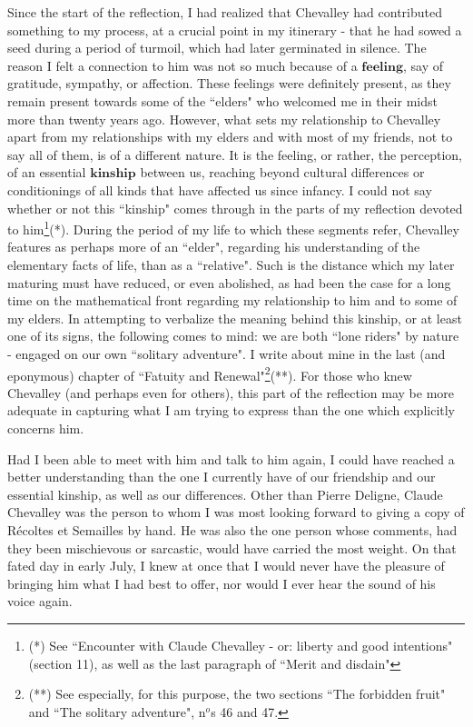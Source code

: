  Since the start of the reflection, I had realized that Chevalley had contributed something to my process, at a crucial point in my itinerary - that he had sowed a seed during a period of turmoil, which had later germinated in silence. The reason I felt a connection to him was not so much because of a $\textbf{feeling}$, say of gratitude, sympathy, or affection. These feelings were definitely present, as they remain present towards some of the ``elders" who welcomed me in their midst more than twenty years ago. However, what sets my relationship to Chevalley apart from my relationships with my elders and with most of my friends, not to say all of them, is of a different nature. It is the feeling, or rather, the perception, of an essential $\textbf{kinship}$ between us, reaching beyond cultural differences or conditionings of all kinds that have affected us since infancy. I could not say whether or not this ``kinship" comes through in the parts of my reflection devoted to him\footnote{(*) See ``Encounter with Claude Chevalley - or: liberty and good intentions" (section 11), as well as the last paragraph of ``Merit and disdain"}(*). During the period of my life to which these segments refer, Chevalley features as perhaps more of an ``elder", regarding his understanding of the elementary facts of life, than as a ``relative". Such is the distance which my later maturing must have reduced, or even abolished, as had been the case for a long time on the mathematical front regarding my relationship to him and to some of my elders. In attempting to verbalize the meaning behind this kinship, or at least one of its signs, the following comes to mind: we are both ``lone riders" by nature - engaged on our own ``solitary adventure". I write about mine in the last (and eponymous) chapter of ``Fatuity and Renewal"\footnote{(**) See especially, for this purpose, the two sections ``The forbidden fruit" and ``The solitary adventure", n$^o$s 46 and 47.}(**). For those who knew Chevalley (and perhaps even for others), this part of the reflection may be more adequate in capturing what I am trying to express than the one which explicitly concerns him.
 
Had I been able to meet with him and talk to him again, I could have reached a better understanding than the one I currently have of our friendship and our essential kinship, as well as our differences. Other than Pierre Deligne, Claude Chevalley was the person to whom I was most looking forward to giving a copy of R\'ecoltes et Semailles by hand. He was also the one person whose comments, had they been mischievous or sarcastic, would have carried the most weight. On that fated day in early July, I knew at once that I would never have the pleasure of bringing him what I had best to offer, nor would I ever hear the sound of his voice again.

